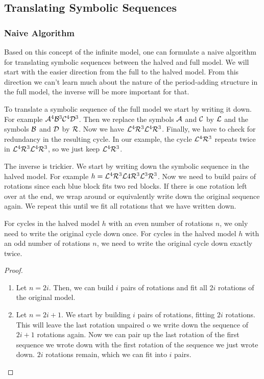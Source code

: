 \subsection{Translating Symbolic Sequences}

\subsubsection{Naive Algorithm}

Based on this concept of the infinite model, one can formulate a naive algorithm for translating symbolic sequences between the halved and full model.
We will start with the easier direction from the full to the halved model.
From this direction we can't learn much about the nature of the period-adding structure in the full model, the inverse will be more important for that.

To translate a symbolic sequence of the full model we start by writing it down.
For example $\mathcal{A}^4\mathcal{B}^3\mathcal{C}^4\mathcal{D}^3$.
Then we replace the symbols $\mathcal{A}$ and $\mathcal{C}$ by $\mathcal{L}$ and the symbols $\mathcal{B}$ and $\mathcal{D}$ by $\mathcal{R}$.
Now we have $\mathcal{L}^4\mathcal{R}^3\mathcal{L}^4\mathcal{R}^3$.
Finally, we have to check for redundancy in the resulting cycle.
In our example, the cycle $\mathcal{L}^4\mathcal{R}^3$ repeats twice in $\mathcal{L}^4\mathcal{R}^3\mathcal{L}^4\mathcal{R}^3$, so we just keep $\mathcal{L}^4\mathcal{R}^3$.

The inverse is trickier.
We start by writing down the symbolic sequence in the halved model.
For example $h = \mathcal{L}^4\mathcal{R}^3\mathcal{L}4\mathcal{R}^3\mathcal{L}^3\mathcal{R}^3$.
Now we need to build pairs of rotations since each blue block fits two red blocks.
If there is one rotation left over at the end, we wrap around or equivalently write down the original sequence again.
We repeat this until we fit all rotations that we have written down.

\begin{lemma}
    \label{lemma:writing.down}
    For cycles in the halved model $h$ with an even number of rotations $n$, we only need to write the original cycle down once.
    For cycles in the halved model $h$ with an odd number of rotations $n$, we need to write the original cycle down exactly twice.
\end{lemma}

\begin{proof} \phantom{x}
    \begin{enumerate}
        \item Let $n = 2i$. Then, we can build $i$ pairs of rotations and fit all $2i$ rotations of the original model.
        \item Let $n = 2i + 1$. We start by building $i$ pairs of rotations, fitting $2i$ rotations.
              This will leave the last rotation unpaired o we write down the sequence of $2i + 1$ rotations again.
              Now we can pair up the last rotation of the first sequence we wrote down with the first rotation of the sequence we just wrote down.
              $2i$ rotations remain, which we can fit into $i$ pairs.
    \end{enumerate}
\end{proof}

